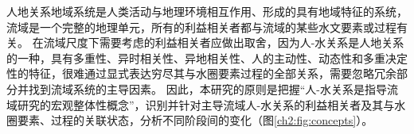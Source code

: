 



人地关系地域系统是人类活动与地理环境相互作用、形成的具有地域特征的系统\cite{tan2021}，流域是一个完整的地理单元，所有的利益相关者都与流域的某些水文要素或过程有关。
在流域尺度下需要考虑的利益相关者应做出取舍，因为人-水关系是人地关系的一种，具有多重性、异时相关性、异地相关性、人的主动性、动态性和多重决定性的特征\cite{fang2004}，很难通过显式表达穷尽其与水圈要素过程的全部关系，需要忽略冗余部分并找到流域系统的主导因素。
因此，本研究的原则是把握“人-水关系是指导流域研究的宏观整体性概念”，识别并针对主导流域人-水关系的利益相关者及其与水圈要素、过程的关联状态，分析不同阶段间的变化（图\ref{ch2:fig:concepts}）。

